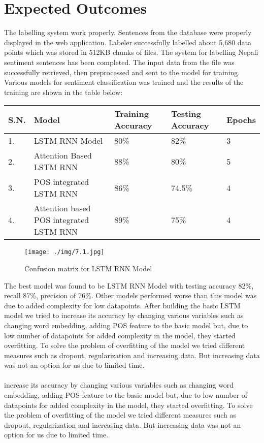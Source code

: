 	\chapter{Expected Outcomes}
    	The labelling system work properly. Sentences from the database were properly displayed in the web application. Labeler successfully labelled about 5,680 data points which was stored in 512KB chunks of files. The system for labelling Nepali sentiment sentences has been completed. The input data from the file was successfully retrieved, then preprocessed and sent to the model for training.
    	\vspace{0.2in}
    	Various models for sentiment classification was trained and the results of the training are shown in the table below:
    	
\begin{center}
    \begin{tabular}{|p{1cm}|p{3cm}|p{4cm}|p{4cm}|p{2cm}| }
        \hline
        S.N. & Model & Training Accuracy & Testing Accuracy & Epochs\\
        \hline
        1. & LSTM RNN Model & 80\% & 82\% & 3\\
        \hline
        2. & Attention Based LSTM RNN & 88\% & 80\% & 5 \\
        \hline
        3. & POS integrated LSTM RNN & 86\% & 74.5\% & 4 \\
        \hline
        4. & Attention based POS integrated LSTM RNN  & 89\% & 75\% & 4 \\
        \hline
    \end{tabular}
    \begin{figure}[h]
	    \centering
		    \texttt{[image: ./img/7.1.jpg]}
		    \caption{Confusion matrix for LSTM RNN Model}
	\end{figure}
\end{center}	
	The best model was found to be LSTM RNN Model with testing accuracy 82\%, recall 87\%, precision of 76\%. Other models performed worse than this model was due to added complexity for low datapoints. After building the basic LSTM model we tried to 
	increase its accuracy by changing various variables such as changing word embedding, adding POS feature to the basic model but, due to low number of datapoints for added complexity in the model, they started overfitting. To solve the problem of overfitting of the model we tried different measures such as dropout, regularization and increasing data. But increasing data was not an option for us due to limited time.\\\\
	increase its accuracy by changing various variables such as changing word embedding, adding POS feature to the basic model but, due to low number of datapoints for added complexity in the model, they started overfitting. To solve the problem of overfitting of the model we tried different measures such as dropout, regularization and increasing data. But increasing data was not an option for us due to limited time.